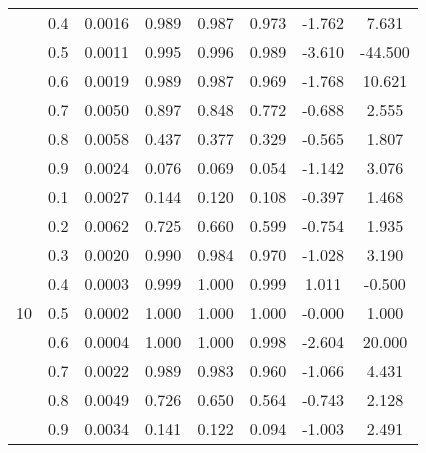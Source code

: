 \documentclass[11pt,a4paper]{report}
\begin{document}
\begin{longtable}{ | c | c || c | c | c | c | c | c | }
 & 0.4 & 0.0016 & 0.989 & 0.987 & 0.973 & -1.762 & 7.631 \\
 & 0.5 & 0.0011 & 0.995 & 0.996 & 0.989 & -3.610 & -44.500 \\
 & 0.6 & 0.0019 & 0.989 & 0.987 & 0.969 & -1.768 & 10.621 \\
 & 0.7 & 0.0050 & 0.897 & 0.848 & 0.772 & -0.688 & 2.555 \\
 & 0.8 & 0.0058 & 0.437 & 0.377 & 0.329 & -0.565 & 1.807 \\
 & 0.9 & 0.0024 & 0.076 & 0.069 & 0.054 & -1.142 & 3.076 \\
 \hline
\multirow{9}{*}{10} & 0.1 & 0.0027 & 0.144 & 0.120 & 0.108 & -0.397 & 1.468 \\
 & 0.2 & 0.0062 & 0.725 & 0.660 & 0.599 & -0.754 & 1.935 \\
 & 0.3 & 0.0020 & 0.990 & 0.984 & 0.970 & -1.028 & 3.190 \\
 & 0.4 & 0.0003 & 0.999 & 1.000 & 0.999 & 1.011 & -0.500 \\
 & 0.5 & 0.0002 & 1.000 & 1.000 & 1.000 & -0.000 & 1.000 \\
 & 0.6 & 0.0004 & 1.000 & 1.000 & 0.998 & -2.604 & 20.000 \\
 & 0.7 & 0.0022 & 0.989 & 0.983 & 0.960 & -1.066 & 4.431 \\
 & 0.8 & 0.0049 & 0.726 & 0.650 & 0.564 & -0.743 & 2.128 \\
 & 0.9 & 0.0034 & 0.141 & 0.122 & 0.094 & -1.003 & 2.491 \\
 \hline
\hline
\end{longtable}
\end{document}
